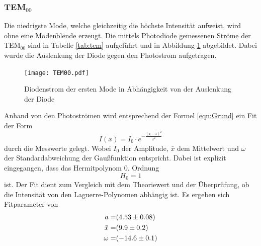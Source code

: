 \subsubsection{TEM$_\text{00}$}
Die niedrigste Mode, welche gleichzeitig die höchste Intensität aufweist, wird ohne eine Modenblende erzeugt. Die mittels Photodiode gemessenen Ströme der TEM$_{00}$ sind in Tabelle \ref{tab:tem} aufgeführt und in Abbildung \ref{fig:TEM00} abgebildet. Dabei wurde die Auslenkung der Diode gegen den Photostrom aufgetragen.
\begin{figure}
  \centering
  \texttt{[image: TEM00.pdf]}
  \caption{Diodenstrom der ersten Mode in Abhängigkeit von der Auslenkung der Diode}
  \label{fig:TEM00}
\end{figure}
Anhand von den Photoströmen wird entsprechend der Formel \ref{eqn:Grund} ein Fit der Form
\begin{equation}
  I(x) = I_0 \cdot e^{- \frac{(x-\bar{x})^2}{\omega^2} }
  \label{eqn:gausian}
\end{equation}
durch die Messwerte gelegt. Wobei $I_0$ der Amplitude, $\bar{x}$ dem Mittelwert und $\omega$ der Standardabweichung der Gaußfunktion entspricht. Dabei ist explizit eingegangen, dass das Hermitpolynom 0. Ordnung
\begin{equation}
  H_0 = 1
  \label{}
\end{equation}
ist. Der Fit dient zum Vergleich mit dem Theoriewert und der Überprüfung, ob die Intensität von den Laguerre-Polynomen abhängig ist. Es ergeben sich Fitparameter von
\begin{eqnarray}
  a =& (\num{4.53 +- 0.08})	\\
  \bar{x} =& (\num{9.9 +- 0.2})	\\
  \omega =& (\num{-14.6 +-0.1})
  \label{eqn:coef}
\end{eqnarray}
